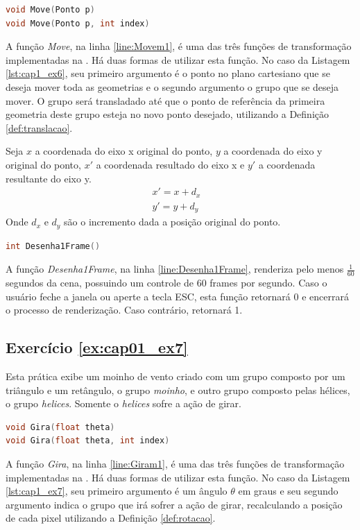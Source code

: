 \begin{lstlisting}[label={func:Move},language=C++]
void Move(Ponto p)
void Move(Ponto p, int index)
\end{lstlisting}
A função \emph{Move}, na linha \ref{line:Movem1}, é uma das três funções de transformação implementadas na \playAPC{}. Há duas formas de utilizar esta função. No caso da Listagem \ref{lst:cap1_ex6}, seu primeiro argumento é o ponto no plano cartesiano que se deseja mover toda as geometrias e o segundo argumento o grupo que se deseja mover. O grupo será transladado até que o ponto de referência da primeira geometria deste grupo esteja no novo ponto desejado, utilizando a Definição \ref{def:translacao}.

\begin{myDef} 
Seja $x$ a coordenada do eixo x original do ponto, $y$ a coordenada do eixo y original do ponto, $x'$ a coordenada resultado do eixo x e $y'$ a coordenada resultante do eixo y.
$$
  \begin{matrix}
  x' = x + d_{x} &\\
  y' = y + d_{y}
  \end{matrix}
$$
Onde $d_{x}$ e $d_{y}$ são o incremento dada a posição original do ponto.
\label{def:translacao}
\end{myDef}

\begin{lstlisting}[label={func:Desenha1Frame},language=C++]
int Desenha1Frame()
\end{lstlisting}
A função \emph{Desenha1Frame}, na linha \ref{line:Desenha1Frame}, renderiza pelo menos $\frac{1}{60}$ segundos da cena, possuindo um controle de 60 frames por segundo. Caso o usuário feche a janela ou aperte a tecla ESC, esta função retornará 0 e encerrará o processo de renderização. Caso contrário, retornará 1.

\subsection*{Exercício \ref{ex:cap01_ex7}}

Esta prática exibe um moinho de vento criado com um grupo composto por um triângulo e um retângulo, o grupo \emph{moinho}, e outro grupo composto pelas hélices, o grupo \emph{helices}. Somente o \emph{helices} sofre a ação de girar. 


\begin{lstlisting}[label={func:Gira},language=C++]
void Gira(float theta)
void Gira(float theta, int index)
\end{lstlisting}
A função \emph{Gira}, na linha \ref{line:Giram1}, é uma das três funções de transformação implementadas na \playAPC{}. Há duas formas de utilizar esta função. No caso da Listagem \ref{lst:cap1_ex7}, seu primeiro argumento é um ângulo $\theta$ em graus e seu segundo argumento indica o grupo que irá sofrer a ação de girar, recalculando a posição de cada pixel utilizando a Definição \ref{def:rotacao}. 

